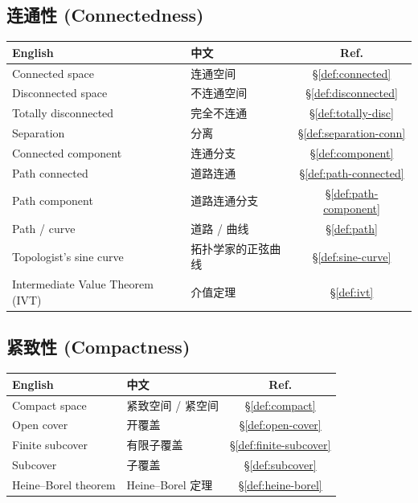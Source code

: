 \documentclass{article}
\begin{document}
\subsection*{连通性 (Connectedness)}

\begin{tabular}{@{}lp{7.5cm}c@{}}
  \hline
  \textbf{English} & \textbf{中文} & \textbf{Ref.} \\
  \hline
  Connected space                  & 连通空间 & \S\ref{def:connected} \\
  Disconnected space              & 不连通空间 & \S\ref{def:disconnected} \\
  Totally disconnected            & 完全不连通 & \S\ref{def:totally-disc} \\
  Separation                      & 分离 & \S\ref{def:separation-conn} \\
  Connected component             & 连通分支 & \S\ref{def:component} \\
  Path connected                  & 道路连通 & \S\ref{def:path-connected} \\
  Path component                  & 道路连通分支 & \S\ref{def:path-component} \\
  Path / curve                    & 道路 / 曲线 & \S\ref{def:path} \\
  Topologist's sine curve         & 拓扑学家的正弦曲线 & \S\ref{def:sine-curve} \\
  Intermediate Value Theorem (IVT)& 介值定理 & \S\ref{def:ivt} \\
  \hline
\end{tabular}

\subsection*{紧致性 (Compactness)}

\begin{tabular}{@{}lp{7.5cm}c@{}}
  \hline
  \textbf{English} & \textbf{中文} & \textbf{Ref.} \\
  \hline
  Compact space                   & 紧致空间 / 紧空间 & \S\ref{def:compact} \\
  Open cover                      & 开覆盖 & \S\ref{def:open-cover} \\
  Finite subcover                 & 有限子覆盖 & \S\ref{def:finite-subcover} \\
  Subcover                        & 子覆盖 & \S\ref{def:subcover} \\
  Heine--Borel theorem            & Heine--Borel 定理 & \S\ref{def:heine-borel} \\
  \hline
\end{tabular}
\end{document}
